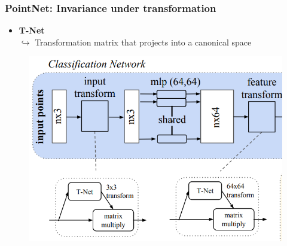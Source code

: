 \documentclass{beamer}
\begin{document}
\begin{frame}[allowframebreaks]
\frametitle{PointNet: Invariance under transformation}
\begin{minipage}{\textwidth}
    \begin{minipage}{0.45\textwidth}
    \begin{itemize}
        \item \textbf{T-Net}\\
        $\hookrightarrow$ Transformation matrix that projects into a canonical space\\
    \end{itemize}
        
    \end{minipage}
    \hfill
    \begin{minipage}{0.45\textwidth}
        \begin{figure}
        \centering
        \includegraphics[width=\textwidth,height=0.8\textheight,keepaspectratio]{img/05_Pointnet_JAN.png}
        
        \label{fig:enter-label}
    \end{figure}
    \end{minipage}
\end{minipage}
\end{frame}
\end{document}

